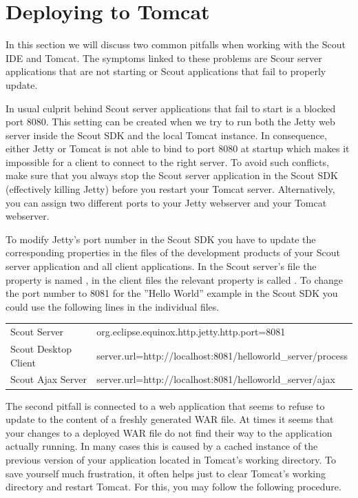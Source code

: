 \documentclass[a4paper,10pt,twoside]{book}
\begin{document}
\section{Deploying to Tomcat}

In this section we will discuss two common pitfalls when working with the Scout IDE and Tomcat.
The symptoms linked to these problems are Scour server applications that are not starting or Scout applications that fail to properly update.

In usual culprit behind Scout server applications that fail to start is a blocked port 8080.
This setting can be created when we try to run both the Jetty web server inside the Scout SDK and the local Tomcat instance.
In consequence, either Jetty or Tomcat is not able to bind to port 8080 at startup which makes it impossible for a client to connect to the right server.
To avoid such conflicts, make sure that you always stop the Scout server application in the Scout SDK (effectively killing Jetty) before you restart your Tomcat server.
Alternatively, you can assign two different ports to your Jetty webserver and your Tomcat webserver.

To modify Jetty's port number in the Scout SDK you have to update the corresponding properties in the  files of the development products of your Scout server application and all client applications.
In the Scout server's  file the property is named , in the client  files the relevant property is called .
To change the port number to 8081 for the ''Hello World'' example in the Scout SDK you could use the following lines in the individual  files.

\begin{tabular}{ll}
 Scout Server         & org.eclipse.equinox.http.jetty.http.port=8081              \\
 Scout Desktop Client & server.url=http://localhost:8081/helloworld\_server/process \\
 Scout Ajax Server    & server.url=http://localhost:8081/helloworld\_server/ajax
\end{tabular}

The second pitfall is connected to a web application that seems to refuse to update to the content of a freshly generated WAR file.
At times it seems that your changes to a deployed WAR file do not find their way to the application actually running. 
In many cases this is caused by a cached instance of the previous version of your application located in Tomcat's working directory.
To save yourself much frustration, it often helps just to clear Tomcat's working directory and restart Tomcat.
For this, you may follow the following procedure.
\end{document}
